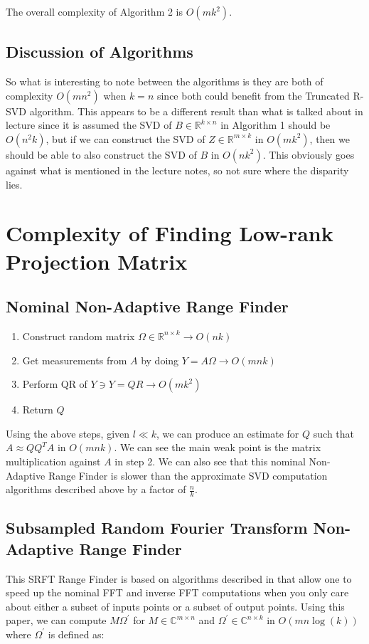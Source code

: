 \documentclass{article}[11pt]
\begin{document}
   The overall complexity of Algorithm 2 is $O(mk^2)$.
   
\subsection{Discussion of Algorithms}
So what is interesting to note between the algorithms is they are both of complexity $O(m n^2)$ when $k = n$ since both could benefit from the Truncated R-SVD algorithm. This appears to be a different result than what is talked about in lecture since it is assumed the SVD of $B \in \mathbb{R}^{k \times n}$ in Algorithm 1 should be $O(n^2k)$, but if we can construct the SVD of $Z \in \mathbb{R}^{m \times k}$  in $O(mk^2)$, then we should be able to also construct the SVD of $B$ in $O(nk^2)$. This obviously goes against what is mentioned in the lecture notes, so not sure where the disparity lies.
   
   \newpage
   \section{ Complexity of Finding Low-rank Projection Matrix }
   \subsection{Nominal Non-Adaptive Range Finder}
   \begin{enumerate}
   \item Construct random matrix $\Omega \in \mathbb{R}^{n \times k} \rightarrow O(nk)$
   \item Get measurements from $A$ by doing $Y = A\Omega \rightarrow O(mnk)$
   \item Perform QR of $Y \ni Y = QR \rightarrow O(mk^2)$
   \item Return $Q$
   \end{enumerate}
   
   Using the above steps, given $l \ll k$, we can produce an estimate for $Q$ such that $A \approx QQ^TA$ in $O(m n k)$. We can see the main weak point is the matrix multiplication against $A$ in step 2. We can also see that this nominal Non-Adaptive Range Finder is slower than the approximate SVD computation algorithms described above by a factor of $\frac{n}{k}$.
   
   \subsection{Subsampled Random Fourier Transform Non-Adaptive Range Finder}
   This SRFT Range Finder is based on algorithms described in \cite{fdft} that allow one to speed up the nominal FFT and inverse FFT computations when you only care about either a subset of inputs points or a subset of output points. Using this paper, we can compute $M \Omega^{'}$ for $M \in \mathbb{C}^{m \times n}$ and $\Omega^{'} \in \mathbb{C}^{n \times k}$ in $O( m n \log(k))$ where $\Omega^{'}$ is defined as:
   
\end{document}
